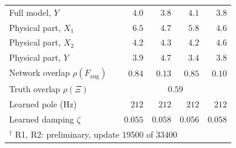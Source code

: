 \begin{tabular}{l r r r r r}
Full model, $Y$ &  & $4.0$ & $3.8$ & $4.1$ & $3.8$\\
Physical part, $X_1$ &  & $6.5$ & $4.7$ & $5.8$ & $4.6$\\
Physical part, $X_2$ &  & $4.2$ & $4.3$ & $4.2$ & $4.6$\\
Physical part, $Y$ &  & $3.9$ & $4.7$ & $3.4$ & $3.8$\\
\midrule
Network overlap $\rho(F_{\mathrm{aug}})$ &  & $0.84$ & $0.13$ & $0.85$ & $0.10$\\
Truth overlap $\rho(\Xi)$ & & \multicolumn{4}{c}{$0.59$}\\
Learned pole (Hz) &  & $212$ & $212$ & $212$ & $212$\\
Learned damping $\zeta$ &  & $0.055$ & $0.058$ & $0.056$ & $0.058$\\
\bottomrule
\multicolumn{6}{l}{\footnotesize $^\dagger$ R1, R2: preliminary, update 19500 of 33400}\\
\end{tabular}
